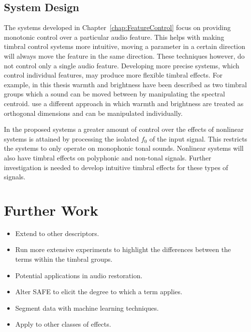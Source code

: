 	\subsection{System Design}
	\label{sec:Conclusion-Critique-SystemDesign}
		The systems developed in Chapter~\ref{chap:FeatureControl} focus on providing monotonic control over a
		particular audio feature. This helps with making timbral control systems more intuitive, moving a parameter
		in a certain direction will always move the feature in the same direction. These techniques however, do not
		control only a single audio feature. Developing more precise systems, which control individual features, may
		produce more flexible timbral effects. For example, in this thesis warmth and brightness have been described
		as two timbral groups which a sound can be moved between by manipulating the spectral centroid.
		\cite{zacharakis2011an} use a different approach in which warmth and brightness are treated as orthogonal
		dimensions and can be manipulated individually.

		In the proposed systems a greater amount of control over the effects of nonlinear systems is attained by
		processing the isolated $f_{0}$ of the input signal. This restricts the systems to only operate on
		monophonic tonal sounds. Nonlinear systems will also have timbral effects on polyphonic and non-tonal
		signals. Further investigation is needed to develop intuitive timbral effects for these types of signals.

\section{Further Work}
\label{sec:Conclusion-FurtherWork}
	\note
	{
		\begin{itemize}
			\item Extend to other descriptors.
			\item Run more extensive experiments to highlight the differences between the terms within the
				timbral groups.
			\item Potential applications in audio restoration.
			\item Alter SAFE to elicit the degree to which a term applies.
			\item Segment data with machine learning techniques.
			\item Apply to other classes of effects.
		\end{itemize}
	}
